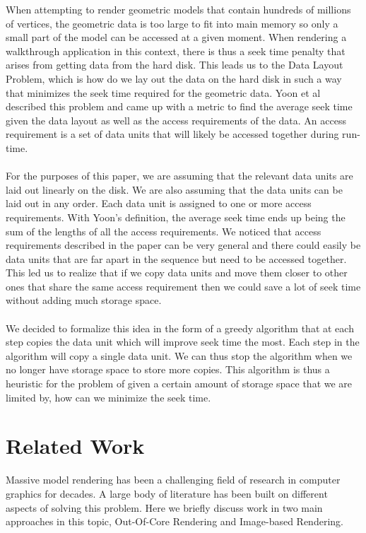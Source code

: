 \documentclass[conference]{acmsiggraph}
\begin{document}
When attempting to render geometric models that contain hundreds of millions of vertices, the geometric data is too large to fit into main memory so only a small part of the model can be accessed at a given moment. When rendering a walkthrough application in this context, there is thus a seek time penalty that arises from getting data from the hard disk. This leads us to the Data Layout Problem, which is how do we lay out the data on the hard disk in such a way that minimizes the seek time required for the geometric data. Yoon et al \cite{cacheobliviouslayout} described this problem and came up with a metric to find the average seek time given the data layout as well as the access requirements of the data. An access requirement is a set of data units that will likely be accessed together during run-time.\\
\\
For the purposes of this paper, we are assuming that the relevant data units are laid out linearly on the disk. We are also assuming that the data units can be laid out in any order. Each data unit is assigned to one or more access requirements. With Yoon's definition, the average seek time ends up being the sum of the lengths of all the access requirements. We noticed that access requirements described in the paper can be very general and there could easily be data units that are far apart in the sequence but need to be accessed together. This led us to realize that if we copy data units and move them closer to other ones that share the same access requirement then we could save a lot of seek time without adding much storage space. \\
\\
We decided to formalize this idea in the form of a greedy algorithm that at each step copies the data unit which will improve seek time the most. Each step in the algorithm will copy a single data unit. We can thus stop the algorithm when we no longer have storage space to store more copies. This algorithm is thus a heuristic for the problem of given a certain amount of storage space that we are limited by, how can we minimize the seek time. 


\section{Related Work}

Massive model rendering has been a challenging field of research in computer graphics for decades. A large body of literature has been built on different aspects of solving this problem. Here we briefly discuss work in two main approaches in this topic, Out-Of-Core Rendering and Image-based Rendering. 
\end{document}
